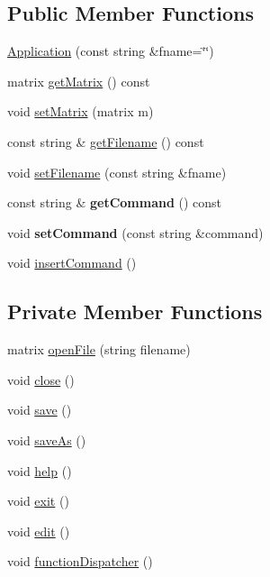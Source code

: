 \subsection*{Public Member Functions}
\begin{DoxyCompactItemize}
\item 
\hyperlink{class_application_ade4650e7378dae1d94794b86995fd571}{Application} (const string \&fname=\char`\"{}\char`\"{})
\item 
matrix \hyperlink{class_application_a67aeb617ca44a18045612d92f1d8afa0}{get\+Matrix} () const
\item 
void \hyperlink{class_application_a56b4a55e9eabd40b7f0033ba39631ebe}{set\+Matrix} (matrix m)
\item 
const string \& \hyperlink{class_application_a778575fb76de5352152d8928e1c3410f}{get\+Filename} () const
\item 
void \hyperlink{class_application_a76de879568ee39ac80484441716928d2}{set\+Filename} (const string \&fname)
\item 
\mbox{\label{class_application_a74cdbc5e93e1f2c6bb4b45a6ad8b8a62}} 
const string \& {\bfseries get\+Command} () const
\item 
\mbox{\label{class_application_ae652f7ff140c5a74c3806f728e9a18f3}} 
void {\bfseries set\+Command} (const string \&command)
\item 
void \hyperlink{class_application_a474d8507e340581404d4044c0228f655}{insert\+Command} ()
\end{DoxyCompactItemize}
\subsection*{Private Member Functions}
\begin{DoxyCompactItemize}
\item 
matrix \hyperlink{class_application_ab2f161414a4e2f16e28321c192051006}{open\+File} (string filename)
\item 
void \hyperlink{class_application_a5a7dcf61b6701a2b2665c78e4e074e73}{close} ()
\item 
void \hyperlink{class_application_a2cbf94e01d55a814de35f90f4d874647}{save} ()
\item 
void \hyperlink{class_application_a10d5a48c95593cee25c1b9e0e257b5a7}{save\+As} ()
\item 
void \hyperlink{class_application_a2c6518d7f121299d9be8c66d31997fbc}{help} ()
\item 
void \hyperlink{class_application_a3c8a98d6c10a5b054800488df16cdbcb}{exit} ()
\item 
void \hyperlink{class_application_a4b193bf9c8be7105e89a2323ea77b1f4}{edit} ()
\item 
void \hyperlink{class_application_a00241f0a09c32b0ef3cb1f068475cc50}{function\+Dispatcher} ()
\end{DoxyCompactItemize}
